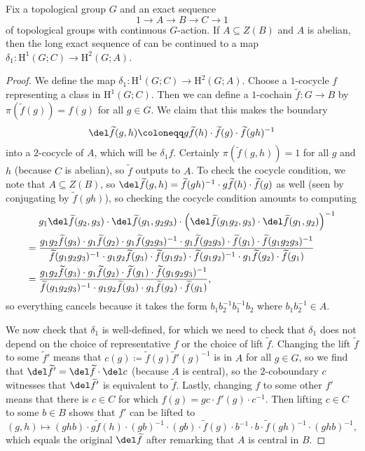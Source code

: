\documentclass[notes.tex]{subfiles}
\begin{document}
\begin{lemma} \label{lem:h1-to-h2}
	Fix a topological group $G$ and an exact sequence
	\[1\to A\to B\to C\to1\]
	of topological groups with continuous $G$-action. If $A\subseteq Z(B)$ and $A$ is abelian, then the long exact sequence of  can be continued to a map $\delta_1\colon\mathrm H^1(G;C)\to\mathrm H^2(G;A)$.
\end{lemma}
\begin{proof}
	We define the map $\delta_1\colon\mathrm H^1(G;C)\to\mathrm H^2(G;A)$. Choose a $1$-cocycle $f$ representing a class in $\mathrm H^1(G;C)$. Then we can define a $1$-cochain $\widetilde f\colon G\to B$ by $\pi\left(\widetilde f(g)\right)=f(g)$ for all $g\in G$. We claim that this makes the boundary
	\[\del\widetilde f(g,h)\coloneqq g\widetilde f(h)\cdot\widetilde f(g)\cdot \widetilde f(gh)^{-1}\]
	into a $2$-cocycle of $A$, which will be $\delta_1f$. Certainly $\pi\left(\widetilde f(g,h)\right)=1$ for all $g$ and $h$ (because $C$ is abelian), so $\widetilde f$ outputs to $A$. To check the cocycle condition, we note that $A\subseteq Z(B)$, so $\del\widetilde f(g,h)=\widetilde f(gh)^{-1}\cdot g\widetilde f(h)\cdot\widetilde f(g)$ as well (seen by conjugating by $\widetilde f(gh)$), so checking the cocycle condition amounts to computing
	\begin{align*}
		& g_1\del\widetilde f(g_2,g_3)\cdot\del\widetilde f(g_1,g_2g_3)\cdot\left(\del\widetilde f(g_1g_2,g_3)\cdot\del\widetilde f(g_1,g_2)\right)^{-1} \\
		={}& \frac{g_1g_2\widetilde f(g_3)\cdot g_1\widetilde f(g_2)\cdot g_1\widetilde f(g_2g_3)^{-1}\cdot g_1\widetilde f(g_2g_3)\cdot \widetilde f(g_1)\cdot\widetilde f(g_1g_2g_3)^{-1}}{\widetilde f(g_1g_2g_3)^{-1}\cdot g_1g_2\widetilde f(g_3)\cdot\widetilde f(g_1g_2)\cdot\widetilde f(g_1g_2)^{-1}\cdot g_1\widetilde f(g_2)\cdot\widetilde f(g_1)} \\
		={}& \frac{g_1g_2\widetilde f(g_3)\cdot g_1\widetilde f(g_2)\cdot  \widetilde f(g_1)\cdot\widetilde f(g_1g_2g_3)^{-1}}{\widetilde f(g_1g_2g_3)^{-1}\cdot g_1g_2\widetilde f(g_3)\cdot g_1\widetilde f(g_2)\cdot\widetilde f(g_1)},
	\end{align*}
	so everything cancels because it takes the form $b_1b_2^{-1}b_1^{-1}b_2$ where $b_1b_2^{-1}\in A$.

	We now check that $\delta_1$ is well-defined, for which we need to check that $\delta_1$ does not depend on the choice of representative $f$ or the choice of lift $\widetilde f$. Changing the lift $\widetilde f$ to some $\widetilde f'$ means that $c(g)\coloneqq\widetilde f(g)\widetilde f'(g)^{-1}$ is in $A$ for all $g\in G$, so we find that $\del\widetilde f'=\del\widetilde f\cdot\del c$ (because $A$ is central), so the $2$-coboundary $c$ witnesses that $\del\widetilde f'$ is equivalent to $\widetilde f$. Lastly, changing $f$ to some other $f'$ means that there is $c\in C$ for which $f(g)=gc\cdot f'(g)\cdot c^{-1}$. Then lifting $c\in C$ to some $b\in B$ shows that $f'$ can be lifted to
	\[(g,h)\mapsto (ghb)\cdot g\widetilde f(h)\cdot (gb)^{-1}\cdot(gb)\cdot\widetilde f(g)\cdot b^{-1}\cdot b\cdot\widetilde f(gh)^{-1}\cdot(ghb)^{-1},\]
	which equals the original $\del\widetilde f$ after remarking that $A$ is central in $B$.


\end{proof}
\end{document}
